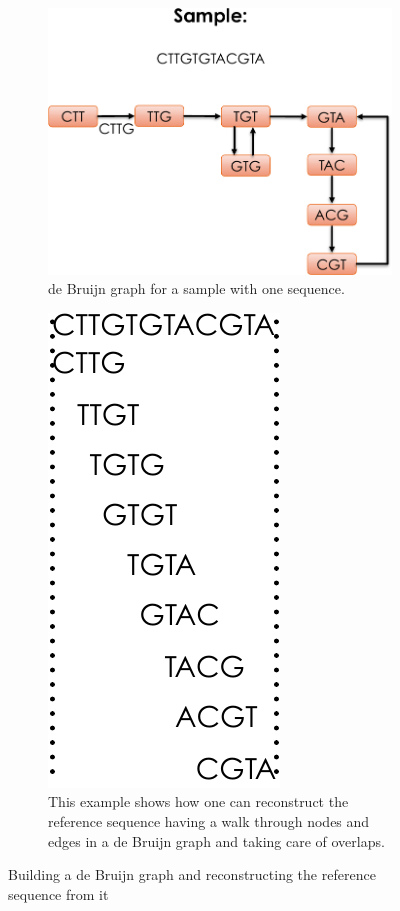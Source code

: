 \begin{figure}
    \centering
    \begin{subfigure}{.5\textwidth}
        \centering
        \includegraphics[width=\linewidth]{figs/dbg1-cropped.pdf}
        \caption{de Bruijn graph for a sample with one sequence.}
        \label{fig:dbg-a}
    \end{subfigure}%
    \begin{subfigure}{.5\textwidth}
        \centering
        \includegraphics[width=.4\linewidth]{figs/dbg2-cropped.pdf}
        \caption{This example shows how one can reconstruct the reference sequence
        having a walk through nodes and edges in a de Bruijn graph and taking care of overlaps.}
        \label{fig:dbg-b}
    \end{subfigure}
    \caption{Building a de Bruijn graph and reconstructing the reference sequence from it}
    \label{fig:dbg}
\end{figure}

